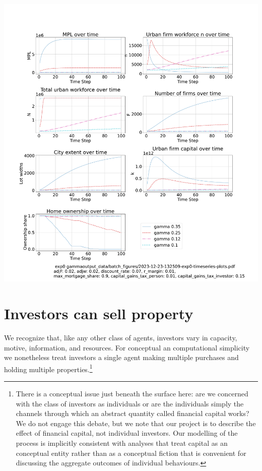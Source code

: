  \hspace*{-2.5cm}\includegraphics[trim= 1.5cm 3.65cm 2cm 4.0cm, clip, scale=.28]{fig/Analysis/Gamma-5-30.pdf}


\section{Investors can sell property}
We recognize that, like any other class of agents, investors vary in capacity, motive, information, and resources. For conceptual an computational simplicity we nonetheless treat investors a single agent making multiple purchases and holding multiple properties.\footnote{There is a conceptual issue just beneath the surface here: are we concerned with the class of investors as individuals or are the individuals simply the channels through which an abstract quantity called financial capital works? We do not engage this debate, but we note that our project is to describe the effect of financial capital, not individual investors. Our modelling of the process is implicitly consistent with analyses that treat capital as an  conceptual entity rather than as a conceptual fiction that is convenient for discussing the aggregate outcomes of individual behaviours. }

